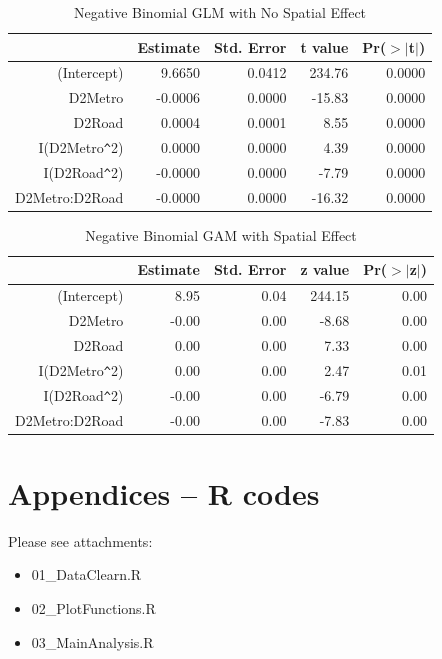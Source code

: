 \documentclass[hidelinks,12pt]{article}
\begin{document}
	\begin{table}[!ht]
		\centering
		\caption{Negative Binomial GLM with No Spatial Effect} \label{tbl:nbglm}
		\begin{tabular}{rrrrr}
			\hline
			& Estimate & Std. Error & t value & Pr($>$$|$t$|$) \\ 
			\hline
			(Intercept) & 9.6650 & 0.0412 & 234.76 & 0.0000 \\ 
			D2Metro & -0.0006 & 0.0000 & -15.83 & 0.0000 \\ 
			D2Road & 0.0004 & 0.0001 & 8.55 & 0.0000 \\ 
			I(D2Metro\verb|^|2) & 0.0000 & 0.0000 & 4.39 & 0.0000 \\ 
			I(D2Road\verb|^|2) & -0.0000 & 0.0000 & -7.79 & 0.0000 \\ 
			D2Metro:D2Road & -0.0000 & 0.0000 & -16.32 & 0.0000 \\ 
			\hline
		\end{tabular}
	\end{table}
	\begin{table}[!ht]
		\centering
		\caption{Negative Binomial GAM with Spatial Effect} \label{tbl:nbgam}
		\begin{tabular}{rrrrr}
			\hline
			& Estimate & Std. Error & z value & Pr($>$$|$z$|$) \\ 
			\hline
			(Intercept) & 8.95 & 0.04 & 244.15 & 0.00 \\ 
			D2Metro & -0.00 & 0.00 & -8.68 & 0.00 \\ 
			D2Road & 0.00 & 0.00 & 7.33 & 0.00 \\ 
			I(D2Metro\verb|^|2) & 0.00 & 0.00 & 2.47 & 0.01 \\ 
			I(D2Road\verb|^|2) & -0.00 & 0.00 & -6.79 & 0.00 \\ 
			D2Metro:D2Road & -0.00 & 0.00 & -7.83 & 0.00 \\ 
			\hline
		\end{tabular}
	\end{table}

	\section{Appendices -- R codes}
	Please see attachments:
	\begin{itemize}
		\item 01\_DataClearn.R
		\item 02\_PlotFunctions.R
		\item 03\_MainAnalysis.R
	\end{itemize}
	
\end{document}
